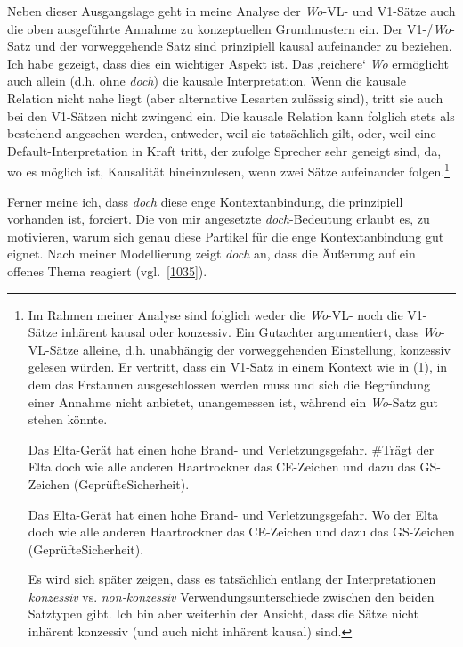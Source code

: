Neben dieser  Ausgangslage geht in meine Analyse der \textit{Wo}-VL- und V1-Sätze auch die oben ausgeführte Annahme zu konzeptuellen Grundmustern  ein. Der V1-/\textit{Wo}-Satz und der vorweggehende Satz sind prinzipiell kausal aufeinander zu beziehen. Ich habe gezeigt, dass dies ein wichtiger Aspekt ist. Das ‚rei\-chere‘ \textit{Wo} ermöglicht auch allein (d.h. ohne \textit{doch}) die kausale Interpretation. Wenn die kausale Relation nicht nahe liegt (aber alternative Lesarten zulässig sind), tritt sie auch bei den V1-Sätzen nicht zwingend ein. Die kausale Relation kann folglich stets als bestehend angesehen werden, entweder, weil sie tatsächlich gilt, oder, weil eine Default-Interpretation in Kraft tritt, der zufolge Sprecher sehr geneigt sind, da, wo es möglich ist, Kausalität hineinzulesen, wenn zwei Sätze aufeinander folgen.\footnote{Im Rahmen meiner Analyse sind folglich weder die \textit{Wo}-VL- noch die V1-Sätze inhärent kausal oder konzessiv. Ein Gutachter argumentiert, dass \textit{Wo}-VL-Sätze alleine, d.h. unabhängig der vorweggehenden Einstellung, konzessiv gelesen würden. Er vertritt, dass ein V1-Satz in einem Kontext wie in (\ref{1037}), in dem das Erstaunen ausgeschlossen werden muss und sich die Begründung einer Annahme nicht anbietet, unangemessen ist, während ein \textit{Wo}-Satz gut stehen könnte. 

\begin{exe}
	\ex\label{1037}
	Das Elta-Gerät hat einen hohe Brand- und Verletzungsgefahr. \#Trägt der Elta doch wie alle anderen Haartrockner das CE-Zeichen und dazu das GS-Zeichen 		(GeprüfteSicherheit).   
\end{exe}

\begin{exe}
	\ex\label{1038}
	Das Elta-Gerät hat einen hohe Brand- und Verletzungsgefahr. Wo der Elta doch wie alle anderen Haartrockner das CE-Zeichen und dazu das GS-Zeichen 		(GeprüfteSicherheit).  
\end{exe}
Es wird sich später zeigen, dass es tatsächlich entlang der Interpretationen \textit{konzessiv} vs. \textit{non-konzessiv} Verwendungsunterschiede zwischen den beiden Satztypen gibt. Ich bin aber weiterhin der Ansicht, dass die Sätze nicht inhärent konzessiv (und auch nicht inhärent kausal) sind.
}

Ferner meine ich, dass \textit{doch} diese enge Kontextanbindung, die prinzipiell vor\-handen ist, forciert. Die von mir angesetzte \textit{doch}-Bedeutung erlaubt es, zu motivieren, warum sich genau diese Partikel für die enge Kontextanbindung gut eignet. Nach meiner Modellierung zeigt \textit{doch} an, dass die Äußerung auf ein offenes Thema reagiert (vgl.\ \ref{1035}).
 
